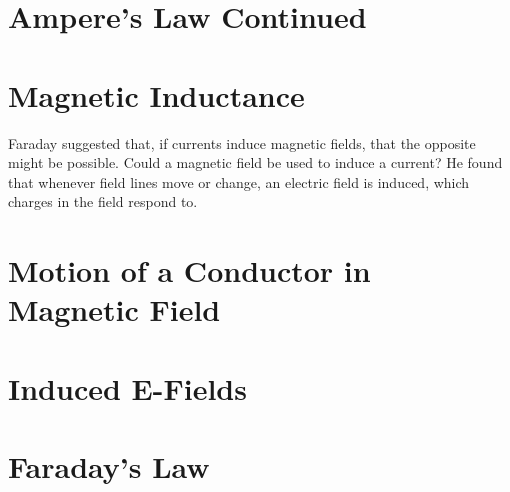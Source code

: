 
\section{Ampere's Law Continued}

\section{Magnetic Inductance}
Faraday suggested that, if currents induce magnetic fields, that the opposite might be possible. Could a magnetic field be used to induce a current? He found that whenever field lines move or change, an electric field is induced, which charges in the field respond to.

\section{Motion of a Conductor in Magnetic Field}

\section{Induced E-Fields}

\section{Faraday's Law}

